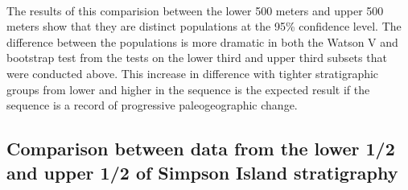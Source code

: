 \documentclass{article}
\begin{document}
    \begin{center}
    \end{center}
    { \hspace*{\fill} \\}
    
    The results of this comparision between the lower 500 meters and upper
500 meters show that they are distinct populations at the 95\%
confidence level. The difference between the populations is more
dramatic in both the Watson V and bootstrap test from the tests on the
lower third and upper third subsets that were conducted above. This
increase in difference with tighter stratigraphic groups from lower and
higher in the sequence is the expected result if the sequence is a
record of progressive paleogeographic change.


    \subsection{Comparison between data from the lower 1/2 and upper 1/2 of Simpson
Island stratigraphy}
\end{document}
